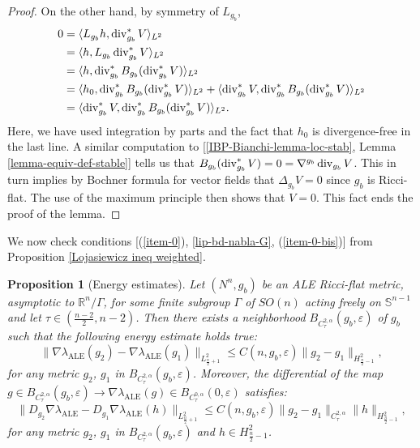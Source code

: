 \documentclass[a4paper,11pt,reqno]{amsart}
\newtheorem{prop}[defn]{Proposition}
\def\RR{\mathbb{R}}
\def\div{\mathop{\rm div}\nolimits}
\def\div{\mathop{\rm div}\nolimits}
\numberwithin{equation}{section}
\begin{document}
\begin{proof}
On the other hand, by symmetry of $L_{g_b}$, 
\begin{equation}
\begin{split}
   0&=\langle L_{g_b}h,\div^*_{g_b}V\rangle_{L^2}\\
   &=\langle h,L_{g_b}\div^*_{g_b}V\rangle_{L^2}\\
   &=\langle h,\div^*_{g_b}B_{g_b}(\div^*_{g_b}V)\rangle_{L^2}\\
   &=\langle h_0,\div^*_{g_b}B_{g_b}(\div^*_{g_b}V)\rangle_{L^2}+\langle \div^*_{g_b}V,\div^*_{g_b}B_{g_b}(\div^*_{g_b}V)\rangle_{L^2}\\
   &=\langle \div^*_{g_b}V,\div^*_{g_b}B_{g_b}(\div^*_{g_b}V)\rangle_{L^2}.
   \end{split}
\end{equation}
Here, we have used integration by parts and the fact that $h_0$ is divergence-free in the last line. A similar computation to [\eqref{IBP-Bianchi-lemma-loc-stab}, Lemma \ref{lemma-equiv-def-stable}] tells us that $B_{g_b}(\div^*_{g_b}V)=0=\nabla^{g_b}\div_{g_b}V$. This in turn implies by Bochner formula for vector fields that $\Delta_{g_b}V=0$ since $g_b$ is Ricci-flat. The use of the maximum principle then shows that $V=0$. This fact ends the proof of the lemma.


\end{proof}	
	
	
	We now check conditions [(\ref{item-0}), \eqref{lip-bd-nabla-G}, (\ref{item-0-bis})] from Proposition \ref{Lojasiewicz ineq weighted}.
	\begin{prop}[Energy estimates]\label{prop-energy-est}
		Let $(N^n,g_b)$ be an ALE Ricci-flat metric, asymptotic to $\RR^n\slash\Gamma$, for some finite subgroup $\Gamma$ of $SO(n)$ acting freely on $\mathbb{S}^{n-1}$ and let $\tau\in (\frac{n-2}{2},n-2)$. Then there exists a neighborhood $B_{C^{2,\alpha}_{\tau}}(g_b,\varepsilon)$ of $g_b$ such that the following energy estimate holds true:
		\begin{equation}
		\|\nabla\lambda_{\operatorname{ALE}}(g_2)-\nabla\lambda_{\operatorname{ALE}}(g_1)\|_{L^2_{\frac{n}{2}+1}}\leq C(n,g_b,\varepsilon)\|g_2-g_1\|_{H^2_{\frac{n}{2}-1}}, \label{energy-est}
		\end{equation}
		for any metric $g_2$, $g_1$ in $B_{C^{2,\alpha}_{\tau}}(g_b,\varepsilon)$.
		Moreover, the differential of the map $g\in B_{C^{2,\alpha}_{\tau}}(g_b,\varepsilon)\rightarrow \nabla\lambda_{\operatorname{ALE}}(g)\in B_{C^{0,\alpha}_{\tau}}(0,\varepsilon)$ satisfies:
		\begin{equation}
		\|D_{g_2}\nabla\lambda_{\operatorname{ALE}}-D_{g_1}\nabla\lambda_{\operatorname{ALE}}(h)\|_{L^2_{\frac{n}{2}+1}}\leq C(n,g_b,\varepsilon)\|g_2-g_1\|_{C^{2,\alpha}_{\tau}}\|h\|_{H^2_{\frac{n}{2}-1}}, \label{energy-est-bis}
		\end{equation}
		for any metric $g_2$, $g_1$ in $B_{C^{2,\alpha}_{\tau}}(g_b,\varepsilon)$ and $h\in H^2_{\frac{n}{2}-1}$.
	\end{prop}
	
\end{document}
